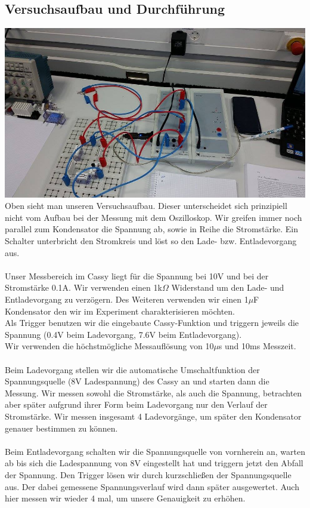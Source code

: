 \documentclass[12pt,a4paper]{article}
\begin{document}
\subsection{Versuchsaufbau und Durchführung}
\includegraphics[scale=0.35]{12834837_1207198225971904_686312351_n.jpg}
\\Oben sieht man unseren Versuchsaufbau. Dieser unterscheidet sich prinzipiell nicht vom Aufbau bei der Messung mit dem Oszilloskop. Wir greifen immer noch parallel zum Kondensator die Spannung ab, sowie in Reihe die Stromstärke. Ein Schalter unterbricht den Stromkreis und löst so den Lade- bzw. Entladevorgang aus.\\
\\Unser Messbereich im Cassy liegt für die Spannung bei 10V und bei der Stromstärke 0.1A. Wir verwenden einen 1k$\Omega$ Widerstand um den Lade- und Entladevorgang zu verzögern. Des Weiteren verwenden wir einen 1$\mu$F Kondensator den wir im Experiment charakterisieren möchten.\\
Als Trigger benutzen wir die eingebaute Cassy-Funktion und triggern jeweils die Spannung (0.4V beim Ladevorgang, 7.6V beim Entladevorgang).\\
Wir verwenden die höchstmögliche Messauflösung von 10$\mu$s und 10ms Messzeit.\\
\\Beim Ladevorgang stellen wir die automatische Umschaltfunktion der Spannungsquelle (8V Ladespannung) des Cassy an und starten dann die Messung. Wir messen sowohl die Stromstärke, als auch die Spannung, betrachten aber später aufgrund ihrer Form beim Ladevorgang nur den Verlauf der Stromstärke. Wir messen insgesamt 4 Ladevorgänge, um später den Kondensator genauer bestimmen zu können. \\
\\Beim Entladevorgang schalten wir die Spannungsquelle von vornherein an, warten ab bis sich die Ladespannung von 8V eingestellt hat und triggern jetzt den Abfall der Spannung. Den Trigger lösen wir durch kurzschließen der Spannungsquelle aus. Der dabei gemessene Spannungsverlauf wird dann später ausgewertet. Auch hier messen wir wieder 4 mal, um unsere Genauigkeit zu erhöhen.\\
\end{document}
